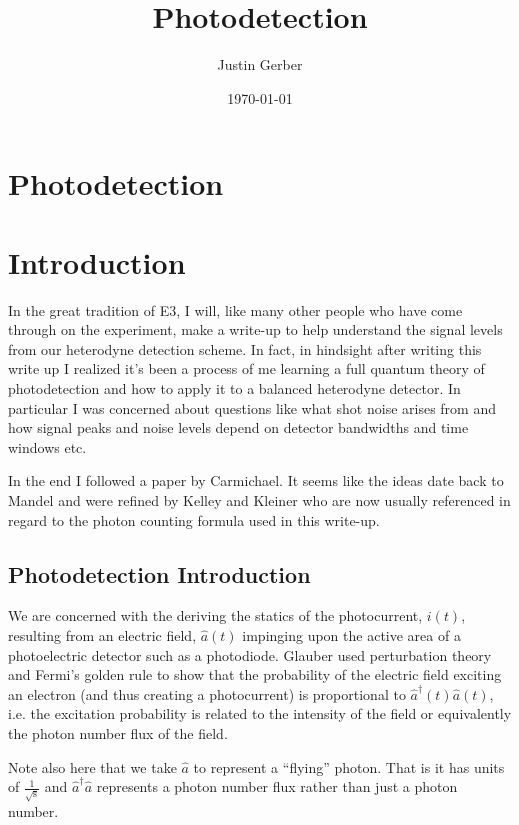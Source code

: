 \documentclass[12pt]{article}
\begin{document}
\title{Photodetection}
\author{Justin Gerber}
\date{\today}
\maketitle

\section{Photodetection}

\section{Introduction}

In the great tradition of E3, I will, like many other people who have come through on the experiment, make a write-up to help understand the signal levels from our heterodyne detection scheme. In fact, in hindsight after writing this write up I realized it's been a process of me learning a full quantum theory of photodetection and how to apply it to a balanced heterodyne detector. In particular I was concerned about questions like what shot noise arises from and how signal peaks and noise levels depend on detector bandwidths and time windows etc.

In the end I followed a paper by Carmichael. It seems like the ideas date back to Mandel and were refined by Kelley and Kleiner who are now usually referenced in regard to the photon counting formula used in this write-up.


\subsection{Photodetection Introduction}

We are concerned with the deriving the statics of the photocurrent, $i(t)$, resulting from an electric field, $\hat{a}(t)$ impinging upon the active area of a photoelectric detector such as a photodiode. Glauber used perturbation theory and Fermi's golden rule to show that the probability of the electric field exciting an electron (and thus creating a photocurrent) is proportional to $\hat{a}^{\dag}(t)\hat{a}(t)$, i.e. the excitation probability is related to the intensity of the field or equivalently the photon number flux of the field.

Note also here that we take $\hat{a}$ to represent a ``flying'' photon. That is it has units of $\frac{1}{\sqrt{\text{s}}}$ and $\hat{a}^{\dag}\hat{a}$ represents a photon number flux rather than just a photon number.
\end{document}
